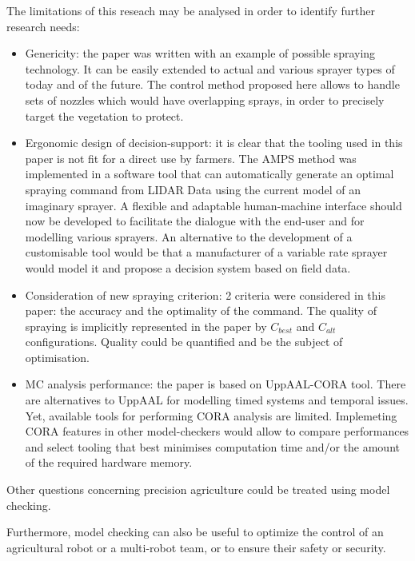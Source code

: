 \documentclass[preprint,3p,times,twocolumn]{elsarticle}
\begin{document}
The limitations of this reseach may be analysed in order to identify further research needs:
\begin{itemize}
	\item Genericity: the paper was written with an example of possible spraying technology. It can be easily extended to actual and various sprayer types of today and of the future. The control method proposed here allows to handle sets of nozzles which would have overlapping sprays, in order to precisely target the vegetation to protect.
	\item Ergonomic design of decision-support: it is clear that the tooling used in this paper is not fit for a direct use by farmers. The AMPS method was implemented in a software tool that can automatically generate an optimal spraying command from LIDAR Data using the current model of an imaginary sprayer. A flexible and adaptable human-machine interface should now be developed to facilitate the dialogue with the end-user and for modelling various sprayers. An alternative to the development of a customisable tool would be that a manufacturer of a variable rate sprayer would model it and propose a decision system based on field data.
	\item Consideration of new spraying criterion: 2 criteria were considered in this paper: the accuracy and the optimality of the command. The quality of spraying is implicitly represented in the paper by $C_{best}$ and $C_{alt}$ configurations. Quality could be  quantified and be the subject of optimisation.
	\item MC analysis performance: the paper is based on UppAAL-CORA tool. There are alternatives to UppAAL for modelling timed systems and temporal issues. Yet, available tools for performing CORA analysis are limited. Implemeting CORA features in other model-checkers would allow to compare performances and select tooling that best minimises computation time and/or the amount of the required hardware memory.
\end{itemize}

Other questions concerning precision agriculture could be treated using model checking.

Furthermore, model checking can also be useful to optimize the control of an agricultural robot or a multi-robot team, or to ensure their safety or security.

  



\appendix










\end{document}
